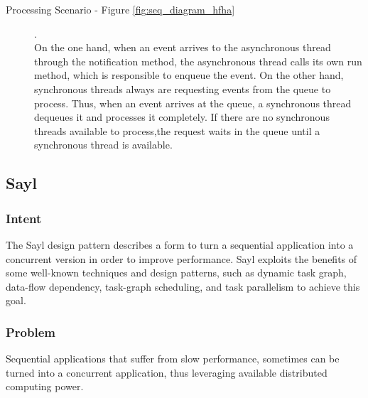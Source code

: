 
\begin{description}
	
	
	\item[Processing Scenario - Figure \ref{fig:seq_diagram_hfha}].\\ 
	On the one hand, when an event arrives to the asynchronous thread through the notification method, the asynchronous thread calls its own run method, which is responsible to enqueue the event. On the other hand, synchronous threads always are requesting events from the queue to process. Thus, when an event arrives at the queue, a synchronous thread dequeues it and processes it completely. If there are no synchronous threads available to process,the request waits in the queue until a synchronous thread is available.
	
\end{description}

\subsection{Sayl}

\subsubsection{Intent}

The Sayl design pattern describes a form to turn a sequential application into a concurrent version in order to improve performance. Sayl exploits the benefits of some well-known techniques and design patterns, such as dynamic task graph, data-flow dependency, task-graph scheduling, and task parallelism to achieve this goal.

\subsubsection{Problem}

Sequential applications that suffer from slow performance, sometimes can be turned into a concurrent application, thus leveraging available distributed computing power.

